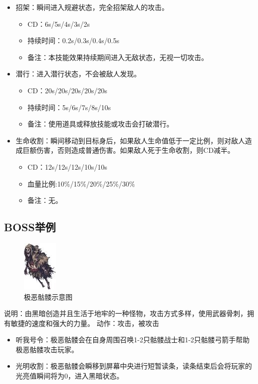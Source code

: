\documentclass[UTF8,AutoFakeBold=1,AutoFakeSlant,zihao=-4]{cucthesis}
\begin{document}
\begin{itemize}
    \item 招架：瞬间进入规避状态，完全招架敌人的攻击。
    \begin{itemize}
        \item CD：6s/5s/4s/3s/2s
        \item 持续时间：0.2s/0.3s/0.4s/0.5s
        \item 备注：本技能效果持续期间进入无敌状态，无视一切攻击。
    \end{itemize}

    \item 潜行：进入潜行状态，不会被敌人发现。
    \begin{itemize}
        \item CD：20s/20s/20s/20s/20s
        \item 持续时间：5s/6s/7s/8s/10s
        \item 备注：使用道具或释放技能或攻击会打破潜行。
    \end{itemize}

    \item 生命收割：瞬间移动到目标身后，如果敌人生命值低于一定比例，则对敌人造成巨额伤害，否则造成普通伤害。如果敌人死于生命收割，则CD减半。
    \begin{itemize}
        \item CD：12s/12s/12s/10s/10s
        \item 血量比例:10\%/15\%/20\%/25\%/30\%
        \item 备注：无。
    \end{itemize}
\end{itemize}


\subsection{BOSS举例}
\begin{figure}[ht]
    \centering
    \includegraphics[scale=1.0]{imgs/极恶骷髅.jpg}    
    \caption{极恶骷髅示意图}
\end{figure}

说明：由黑暗创造并且生活于地牢的一种怪物，攻击方式多样，使用武器骨刺，拥有敏捷的速度和强大的力量。
动作：攻击，被攻击

\begin{itemize}
    \item 听我号令：极恶骷髅会在自身周围召唤1-2只骷髅战士和1-2只骷髅弓箭手帮助极恶骷髅攻击玩家。
    \item 光明收割：极恶骷髅会瞬移到屏幕中央进行短暂读条，读条结束后会将玩家的光亮值瞬间将为0，进入黑暗状态。
\end{itemize}
\end{document}
